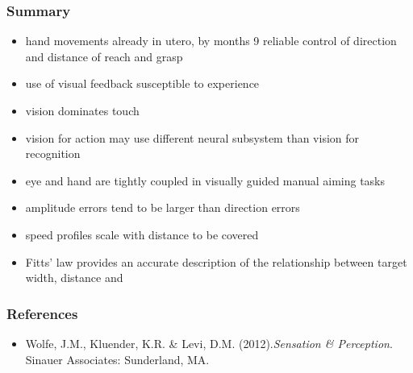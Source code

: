 \documentclass[]{beamer}
\begin{document}
\begin{frame}
 \frametitle{Summary}
\begin{itemize}
\setlength{\itemsep}{5pt}
 \item hand movements already in utero, by months 9 reliable control of direction and distance of reach and grasp
 \item use of visual feedback susceptible to experience
 \item vision dominates touch
 \item vision for action may use different neural subsystem than vision for recognition
 \item eye and hand are tightly coupled in visually guided manual aiming tasks
 \item amplitude errors tend to be larger than direction errors
 \item speed profiles scale with distance to be covered
 \item Fitts' law provides an accurate description of the relationship between target width, distance and 
\end{itemize}
\end{frame}



\begin{frame}
 \frametitle{References}
\begin{small}
\begin{itemize}
 \item  Wolfe, J.M., Kluender, K.R. \& Levi, D.M. (2012).\textit{Sensation \& Perception}. Sinauer Associates: Sunderland, MA. 
\end{itemize}
\end{small}
\end{frame}
\end{document}
